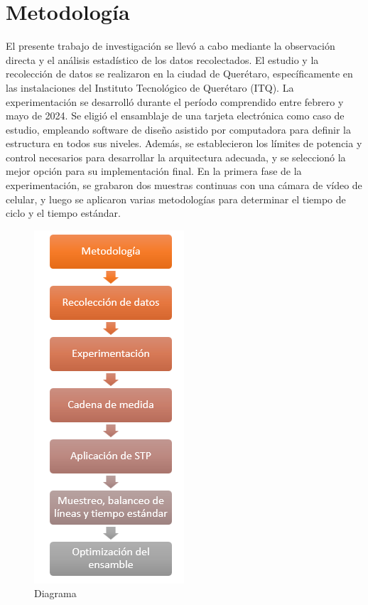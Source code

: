 \section{Metodología}

El presente trabajo de investigación se llevó a cabo mediante la observación directa y el análisis estadístico de los datos recolectados.
El estudio y la recolección de datos se realizaron en la ciudad de Querétaro, específicamente en las instalaciones del Instituto Tecnológico de Querétaro (ITQ).
La experimentación se desarrolló durante el período comprendido entre febrero y mayo de 2024.
Se eligió el ensamblaje de una tarjeta electrónica como caso de estudio, empleando software de diseño asistido por computadora para definir la estructura en todos sus niveles. Además, se establecieron los límites de potencia y control necesarios para desarrollar la arquitectura adecuada, y se seleccionó la mejor opción para su implementación final. 
En la primera fase de la experimentación, se grabaron dos muestras continuas con una cámara de vídeo de celular, y luego se aplicaron varias metodologías para determinar el tiempo de ciclo y el tiempo estándar.

\begin{figure}[H]
    \centering
    \includegraphics[scale=0.4]{10/Img/diagrama.png}
    \caption{Diagrama}
    \label{fig:diagrama.png}
\end{figure}

